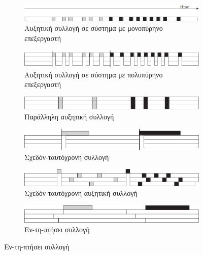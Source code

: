\begin{greek}
\begin{figure}
  \centering
  \begin{subfigure}{1.0\textwidth}
    \includegraphics{figures/conc_1a}
    \caption{Αυξητική συλλογή σε σύστημα με μονοπύρηνο επεξεργαστή}
  \end{subfigure}

\begin{subfigure}[b]{1.0\textwidth}
  \includegraphics{figures/conc_1b}
  \caption{Αυξητική συλλογή σε σύστημα με πολυπύρηνο επεξεργαστή}
\end{subfigure}
  
  \begin{subfigure}[b]{1.0\textwidth}
    \includegraphics{figures/conc_1c}
    \caption{Παράλληλη αυξητική συλλογή}
  \end{subfigure}
  
  \begin{subfigure}[b]{1.0\textwidth}
    \includegraphics{figures/conc_1d}
    \caption{Σχεδόν-ταυτόχρονη συλλογή}
  \end{subfigure}
  
  \begin{subfigure}[b]{1.0\textwidth}
    \includegraphics{figures/conc_1e}
    \caption{Σχεδόν-ταυτόχρονη αυξητική συλλογή}
  \end{subfigure}
  
  \begin{subfigure}[b]{1.0\textwidth}
    \includegraphics{figures/conc_1f}
    \caption{Εν-τη-πτήσει συλλογή}
  \end{subfigure}
  

\end{figure}
\end{greek}
